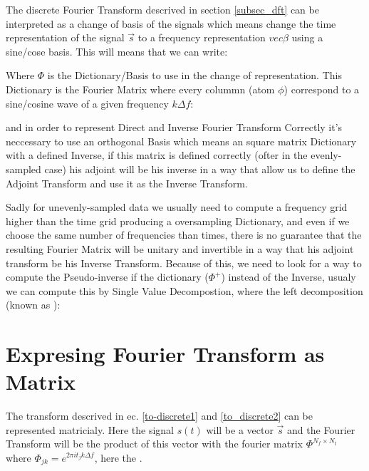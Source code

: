 \newp The discrete Fourier Transform descrived in section \ref{subsec_dft} can be interpreted as a change of basis of the signals which means change the time representation of the signal $\vec{s}$ to a frequency representation $vec{\beta}$ using a sine/cose basis. This will means that we can write:


\newp Where $\Phi$ is the Dictionary/Basis to use in the change of representation. This Dictionary is the Fourier Matrix where every colummn (atom $\phi$) correspond to a sine/cosine wave of a given frequency $k\Delta f$:


 \newp and in order to represent Direct and Inverse Fourier Transform Correctly it's neccessary to use an orthogonal Basis which means an square matrix Dictionary with a defined Inverse, if this matrix is defined correctly (ofter in the evenly-sampled case) his adjoint will be his inverse in a way that allow us to define the Adjoint Transform and use it as the Inverse Transform.
 
 
\newp Sadly for unevenly-sampled data we usually need to compute a frequency grid higher than the time grid producing a oversampling Dictionary, and even if we choose the same number of frequencies than times, there is no guarantee that the resulting Fourier Matrix will be unitary and invertible in a way that his adjoint transform be his Inverse Transform. Because of this, we need to look for a way to compute the Pseudo-inverse if the dictionary ($\Phi^{+}$) instead of the Inverse, usualy we can compute this by Single Value Decompostion, where the left decomposition (known as ):

\insertequation[\label{pseudoinverse}]{\Phi^{+}}

\section{Expresing Fourier Transform as Matrix}{\label{subsec_ftmatrix}}

\newp The transform descrived in ec. \ref{to-discrete1} and \ref{to_discrete2} can be represented matricialy. Here the signal $s(t)$ will be a vector $\vec{s}$ and the Fourier Transform will be the product of this vector with the fourier matrix $\Phi^{N_f \times N_t}$ where $\Phi_{jk} = e^{2 \pi i t_j k \Delta f}$, here the .

